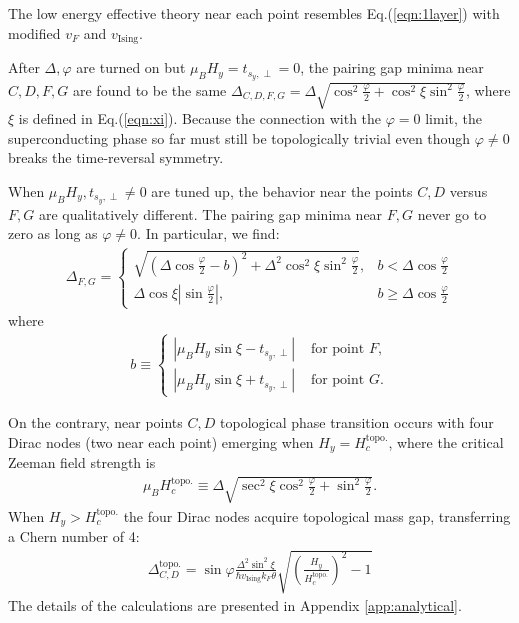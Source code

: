 The low energy effective theory near each point resembles Eq.(\ref{eqn:1layer}) with modified $v_F$ and $v_{\text{Ising}}$.

After $\Delta,\varphi$ are turned on but $\mu_B H_y=t_{s_y,\perp}=0$, the pairing gap minima near $C,D,F,G$ are found to be the same $\Delta_{C,D,F,G}=\Delta\sqrt{\cos^2\frac{\varphi}{2}+\cos^2\xi\sin^2\frac{\varphi}{2}}$, where $\xi$ is defined in Eq.(\ref{eqn:xi}).
Because the connection with the $\varphi=0$ limit, the superconducting phase so far must still be topologically trivial even though $\varphi\neq 0$ breaks the time-reversal symmetry.

When $\mu_B H_y,t_{s_y,\perp} \neq 0$ are tuned up, the behavior near the points $C,D$ versus $F,G$ are qualitatively different. The pairing gap minima near $F,G$ never go to zero as long as $\varphi\neq 0$. In particular, we find:
\begin{align}
	\Delta_{F,G}=\left\{\begin{array} {cc} \sqrt{(\Delta\cos\frac{\varphi}{2}-b)^2+\Delta^2\cos^2\xi\sin^2\frac{\varphi}{2}}, & b<\Delta\cos\frac{\varphi}{2}\\ \Delta\cos\xi|\sin\frac{\varphi}{2}|,&  b\geq \Delta\cos\frac{\varphi}{2}\end{array}\right.\label{eqn:gap_FG}
\end{align}
where
\begin{align}
	b\equiv
	\begin{cases}
		|\mu_B H_y\sin\xi -t_{s_y,\perp}|  & \mbox{ for point } F, \\
		|\mu_B H_y\sin\xi + t_{s_y,\perp}| & \mbox{ for point } G.
	\end{cases}
\end{align}

On the contrary, near points $C,D$ topological phase transition occurs with four Dirac nodes (two near each point) emerging when $H_y=H^{\text{topo.}}_{c}$, where the critical Zeeman field strength is
\begin{align}
	\mu_B H^{\mathrm{topo.}}_{c}\equiv\Delta\sqrt{\sec^2\xi\cos^2\frac{\varphi}{2}+\sin^2\frac{\varphi}{2}}.\label{eqn:Hc_topo}
\end{align}
When $H_y> H^{\mathrm{topo.}}_{c}$ the four Dirac nodes acquire topological mass gap, transferring a Chern number of 4:
\begin{align}
	\Delta^{\text{topo.}}_{C,D}=\sin\varphi\frac{\Delta^2\sin^2\xi}{\hbar v_{\text{Ising}}k_F\theta}\sqrt{\left(\frac{H_y}{H^{\text{topo.}}_{c}}\right)^2-1}\label{eqn:topo_gap}
\end{align}
The details of the calculations are presented in Appendix \ref{app:analytical}.

